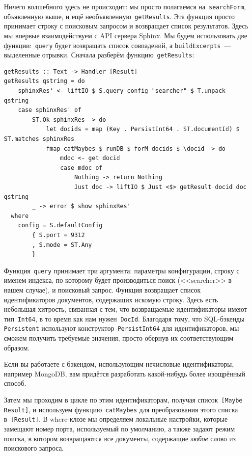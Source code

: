 Ничего волшебного здесь не происходит: мы просто полагаемся
на~\lstinline'searchForm', объявленную выше, и ещё
необъявленную~\lstinline'getResults'. Эта функция просто принимает строку с
поисковым запросом и возвращает список результатов. Здесь мы впервые
взаимодействуем с API сервера Sphinx. Мы будем использовать две
функции:~\lstinline'query' будет возвращать список совпадений, а
\lstinline'buildExcerpts'~--- выделенные отрывки. Сначала разберём
функцию~\lstinline!getResults!:
\begin{lstlisting}
getResults :: Text -> Handler [Result]
getResults qstring = do
    sphinxRes' <- liftIO $ S.query config "searcher" $ T.unpack qstring
    case sphinxRes' of
        ST.Ok sphinxRes -> do
            let docids = map (Key . PersistInt64 . ST.documentId) $ ST.matches sphinxRes
            fmap catMaybes $ runDB $ forM docids $ \docid -> do
                mdoc <- get docid
                case mdoc of
                    Nothing -> return Nothing
                    Just doc -> liftIO $ Just <$> getResult docid doc qstring
        _ -> error $ show sphinxRes'
  where
    config = S.defaultConfig
        { S.port = 9312
        , S.mode = ST.Any
        }
\end{lstlisting}%

Функция~\lstinline'query' принимает три аргумента: параметры конфигурации,
строку с именем индекса, по которому будет производиться поиск (<<searcher>> в
нашем случае), и поисковый запрос. Функция возвращает список идентификаторов
документов, содержащих искомую строку. Здесь есть небольшая хитрость, связанная
с тем, что возвращаемые идентификаторы имеют тип~\lstinline'Int64', в то время
как нам нужен~\lstinline'DocId'. Благодаря тому, что SQL-бэкенды
\lstinline'Persistent' используют конструктор~\lstinline'PersistInt64' для
идентификаторов, мы сможем получить требуемые значения, просто обернув их
соответствующим образом.

\begin{remark}
    Если вы работаете с бэкендом, использующим нечисловые идентификаторы,
    например MongoDB, вам придётся разработать какой-нибудь более изощрённый
    способ.
\end{remark}

Затем мы проходим в цикле по этим идентификаторам, получая
список~\lstinline'[Maybe Result]', и используем функцию~\lstinline'catMaybes'
для преобразования этого списка в~\lstinline'[Result]'. В where-клозе мы
определяем локальные настройки, которые замещают номер порта, используемый по
умолчанию, а также задают режим поиска, в котором возвращаются все документы,
содержащие \emph{любое} слово из поискового запроса.

